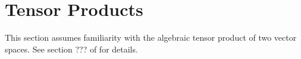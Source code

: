 \documentclass{book}
\begin{document}
%
%



















\newpage
	\section{Tensor Products}
	
	\begin{note}
	This section assumes familiarity with the algebraic tensor product of two vector spaces. See section ??? of \cite{algebra} for details. 
	\end{note}	
	
\end{document}
